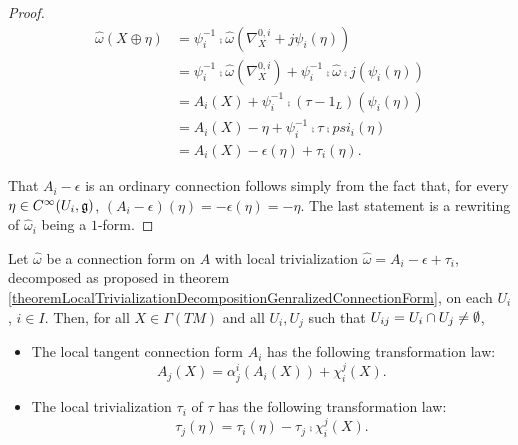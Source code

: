 \begin{proof}
\begin{align*}
    \hat \omega(X \oplus \eta) 
        &= \psi_i^{-1} \comp \hat \omega (\nabla^{0, i}_X + j\psi_i(\eta)) \\
        &= \psi_i^{-1} \comp \hat \omega (\nabla^{0, i}_X) + \psi_i^{-1} \comp \hat \omega \comp j (\psi_i(\eta))\\
        &= A_i(X) + \psi_i^{-1} \comp (\tau - 1_L) (\psi_i(\eta))\\
        &= A_i(X) - \eta + \psi_i^{-1} \comp \tau \comp psi_i(\eta) \\
        &= A_i(X) - \epsilon(\eta) + \tau_i(\eta).
\end{align*}

That $A_i - \epsilon$ is an ordinary connection follows simply from the fact that, for every $\eta \in C^\infty(U_i, \mathfrak{g})$, $(A_i - \epsilon)(\eta) = - \epsilon(\eta) = -\eta$. The last statement is a rewriting of $\hat \omega_i$ being a $1$-form.
\end{proof}

\begin{proposition}\label{propositionTransformationLawsOfAandTau}
Let $\hat \omega$ be a connection form on $A$ with local trivialization $\hat \omega = A_i - \epsilon + \tau_i$, decomposed as proposed in theorem \ref{theoremLocalTrivializationDecompositionGenralizedConnectionForm}, on each $U_i$, $i \in I$. Then, for all $X \in \Gamma(TM)$ and all $U_i, U_j$ such that $U_{ij} = U_i \cap U_j \neq \emptyset$,

    \begin{itemize}
    
    \item The local tangent connection form $A_i$ has the following transformation law:
        \begin{equation}
                A_j(X) = \alpha^i_j(A_i(X)) + \chi^j_i(X).
        \end{equation}
    
    \item The local trivialization $\tau_i$ of $\tau$ has the following transformation law:
        \begin{equation}
                \tau_j(\eta) = \tau_i(\eta) - \tau_j \comp \chi^j_i(X).
        \end{equation}\todo{}
    
    \end{itemize}
\end{proposition}

